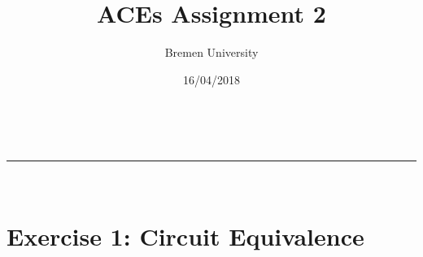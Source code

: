 \documentclass[a4paper,11pt]{article}
\makeatletter
\newcommand{\linia}{\rule{\linewidth}{0.5pt}}
\theoremstyle{mytheor}
\renewcommand{\maketitle}{
\begin{center}
\vspace{2ex}
{\huge \textsc{\@title}}
\vspace{1ex}
\\
\linia\\
\@author \hfill \@date
\vspace{4ex}
\end{center}
}
\makeatother
\begin{document}
\title{ACEs Assignment \textnumero{} 2}

\author{Bremen University}

\date{16/04/2018}

\maketitle

\section*{Exercise 1: Circuit Equivalence}

\begin{comment}
First, use the logical operations to simplify the equation of both circuits.\\
Left one:
\begin{equation} \label{eq1}
\begin{split}
O & = \neg A \land (B \land C) \lor \neg B \\
 & = (\neg B \lor B) \land (\neg B \lor (\neg A \land C))\\
 & = (\neg B \lor B) \land (\neg B \lor \neg A) \land (\neg B \lor C)
\end{split}
\end{equation}
\\
Right one:
\begin{equation} \label{eq2}
\begin{split}
O'& = (A'\land B') \oplus (\neg (B' \lor C') \lor C' \lor A')\\
& = (A'\land B') \oplus (\neg B' \land \neg C' \lor C' \lor A')\\
& = (\neg A' \lor \neg B')\land ((\neg B' \land \neg C') \lor A' \lor C') \lor (A' \land B')\land (\neg (\neg B' \lor \neg C')\land \neg A' \land \neg C')\\
& = \neg B' \lor (\neg A' \land \neg C') \lor (A' \land \neg B')\\
& = \neg B' \lor (\neg A' \land \neg C')\\
& = (\neg B' \lor \neg A')\land (\neg B' \lor \neg C')
\end{split}
\end{equation}
\\
Verify the equivalency:
\begin{equation} \label{eq3}
(\neg O \lor \neg O')\land (O \lor O')
\end{equation}
\end{comment}
\end{document}
